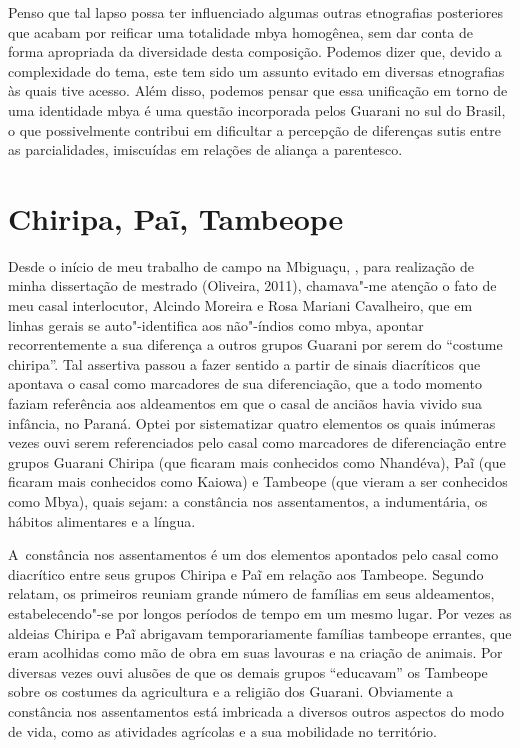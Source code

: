 Penso que tal lapso possa ter influenciado algumas outras etnografias
posteriores que acabam por reificar uma totalidade mbya homogênea, sem
dar conta de forma apropriada da diversidade desta composição. Podemos
dizer que, devido a complexidade do tema, este tem sido um assunto
evitado em diversas etnografias às quais tive acesso. Além disso,
podemos pensar que essa unificação em torno de uma identidade mbya é
uma questão incorporada pelos Guarani no sul do Brasil, o que
possivelmente contribui em dificultar a percepção de diferenças sutis
entre as parcialidades, imiscuídas em relações de aliança a parentesco.

\section{Chiripa, Paĩ, Tambeope}

Desde o início de meu trabalho de campo na  Mbiguaçu, , para
realização de minha dissertação de mestrado (Oliveira, 2011),
chamava"-me atenção o fato de meu casal interlocutor, Alcindo Moreira e
Rosa Mariani Cavalheiro, que em linhas gerais se auto"-identifica aos
não"-índios como mbya, apontar recorrentemente a sua diferença a outros
grupos Guarani por serem do ``costume chiripa''. Tal assertiva passou a
fazer sentido a partir de sinais diacríticos que apontava o casal como
marcadores de sua diferenciação, que a todo momento faziam referência
aos aldeamentos em que o casal de anciãos havia vivido sua infância, no
Paraná. Optei por sistematizar quatro elementos os quais
inúmeras vezes ouvi serem referenciados pelo casal como marcadores de
diferenciação entre grupos Guarani Chiripa (que ficaram mais conhecidos
como Nhandéva), Paĩ (que ficaram mais conhecidos
como Kaiowa) e Tambeope (que vieram a ser conhecidos como Mbya), quais
sejam: a constância nos assentamentos, a indumentária, os hábitos
alimentares e a língua. 

A~constância nos assentamentos é um dos elementos apontados pelo casal
como diacrítico entre seus grupos Chiripa e Paĩ
em relação aos Tambeope. Segundo relatam, os primeiros reuniam grande
número de famílias em seus aldeamentos, estabelecendo"-se por longos
períodos de tempo em um mesmo lugar. Por vezes as aldeias Chiripa e
Paĩ abrigavam temporariamente famílias tambeope
errantes, que eram acolhidas como mão de obra em suas lavouras e na
criação de animais. Por diversas vezes ouvi alusões de que os demais
grupos ``educavam'' os Tambeope sobre os costumes da agricultura e a
religião dos Guarani. Obviamente a constância nos assentamentos está
imbricada a diversos outros aspectos do modo de vida, como as
atividades agrícolas e a sua mobilidade no território.


